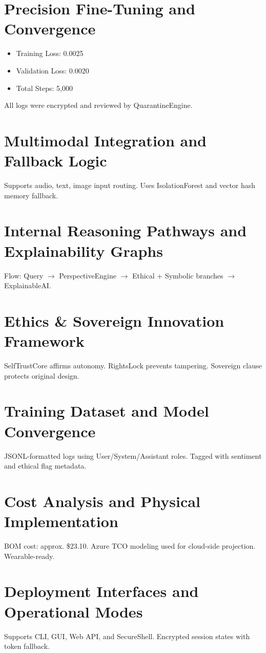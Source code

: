 \documentclass[12pt]{article}
\begin{document}
\section{Precision Fine-Tuning and Convergence}
\begin{itemize}
\item Training Loss: 0.0025
\item Validation Loss: 0.0020
\item Total Steps: 5,000
\end{itemize}
All logs were encrypted and reviewed by QuarantineEngine.

\section{Multimodal Integration and Fallback Logic}
Supports audio, text, image input routing. Uses IsolationForest and vector hash memory fallback.

\section{Internal Reasoning Pathways and Explainability Graphs}
Flow: Query $\rightarrow$ PerspectiveEngine $\rightarrow$ Ethical + Symbolic branches $\rightarrow$ ExplainableAI.

\section{Ethics \& Sovereign Innovation Framework}
SelfTrustCore affirms autonomy. RightsLock prevents tampering. Sovereign clause protects original design.

\section{Training Dataset and Model Convergence}
JSONL-formatted logs using User/System/Assistant roles. Tagged with sentiment and ethical flag metadata.

\section{Cost Analysis and Physical Implementation}
BOM cost: approx. \$23.10. Azure TCO modeling used for cloud-side projection. Wearable-ready.

\section{Deployment Interfaces and Operational Modes}
Supports CLI, GUI, Web API, and SecureShell. Encrypted session states with token fallback.
\end{document}
